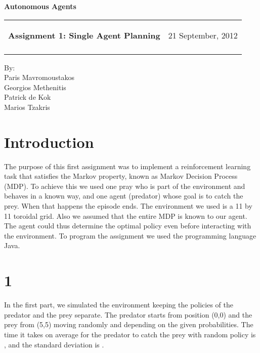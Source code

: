 \documentclass[letterpaper,11pt]{article}
\newcommand{\resheading}[1]{{\large \colorbox{mygrey}{\begin{minipage}{\textwidth}{\textbf{#1 \vphantom{p\^{E}}}}\end{minipage}}}}
\begin{document}
\begin{center}
{\LARGE \textbf{Autonomous Agents}}\\ [1em]
\end{center}
\newcommand{\mywebheader}{
    \begin{tabular}{@{}p{5in}p{4in}}
		{\resheading{Assignment 1: Single Agent Planning}} & {\Large 21 September, 2012}\\\vspace{0.2cm}
	    \end{tabular}}
    \mywebheader
    
    	\begin{center}
    	{\Large By:} \\ \vspace{0.1cm}
	    {\Large Paris Mavromoustakos} \\  \vspace{0.1cm}
	    {\Large Georgios Methenitis} \\ \vspace{0.1cm}
	    {\Large Patrick de Kok} \\ \vspace{0.1cm}
	    {\Large Marios Tzakris}
	    \end{center}

  
  \section*{Introduction}
  The purpose of this first assignment was to implement a reinforcement learning task that satisfies the Markov property, known as Markov Decision Process (MDP). To achieve this we used one pray who is part of the environment and behaves in a known way, and one agent (predator) whose goal is to catch the prey. When that happens the episode ends. The environment we used is a 11 by 11 toroidal grid. Also we assumed that the entire MDP is known to our agent. The agent could thus determine the optimal policy even before interacting with the environment. To program the assignment we used the programming language Java.
 
 \section*{1}
In the first part, we simulated the environment keeping the policies of the predator and the prey separate. The predator starts from position (0,0) and the prey from (5,5) moving randomly and depending on the given probabilities. The time it takes on average for the predator to catch the prey with random policy is , and the standard deviation is .
 
\end{document}
